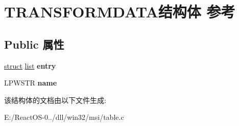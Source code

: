 \hypertarget{struct_t_r_a_n_s_f_o_r_m_d_a_t_a}{}\section{T\+R\+A\+N\+S\+F\+O\+R\+M\+D\+A\+T\+A结构体 参考}
\label{struct_t_r_a_n_s_f_o_r_m_d_a_t_a}
\subsection*{Public 属性}
\begin{DoxyCompactItemize}
\item 
\mbox{\label{struct_t_r_a_n_s_f_o_r_m_d_a_t_a_a41eabbc6edcc96af0c2a31143421b396}} 
\hyperlink{interfacestruct}{struct} \hyperlink{classlist}{list} {\bfseries entry}
\item 
\mbox{\label{struct_t_r_a_n_s_f_o_r_m_d_a_t_a_abd22179ddf518337175339f0db0ece22}} 
L\+P\+W\+S\+TR {\bfseries name}
\end{DoxyCompactItemize}


该结构体的文档由以下文件生成\+:\begin{DoxyCompactItemize}
\item 
E\+:/\+React\+O\+S-\/0../dll/win32/msi/table.\+c\end{DoxyCompactItemize}
